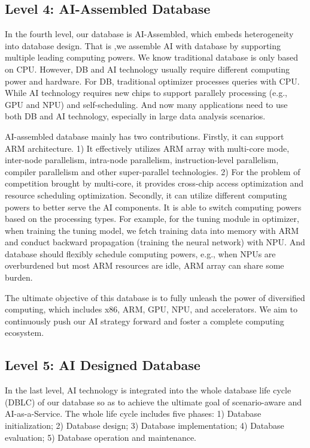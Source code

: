 \subsection{Level 4: AI-Assembled Database}
\label{subsec: assemble}
In the fourth level, our database is AI-Assembled, which embeds heterogeneity into database design. That is ,we assemble AI with database by supporting multiple leading computing powers. We know traditional database is only based on CPU. However, DB and AI technology usually require different computing power and hardware. For DB, traditional optimizer processes queries with CPU. While AI technology requires new chips to support parallely processing (e.g., GPU and NPU) and self-scheduling. And now many applications need to use both DB and AI technology, especially in large data analysis scenarios.

AI-assembled database mainly has two contributions. Firstly, it can support ARM architecture. 
1) It effectively utilizes ARM array with multi-core mode, inter-node parallelism, intra-node parallelism, instruction-level parallelism, compiler parallelism and other super-parallel technologies. 
2) For the problem of competition brought by multi-core, it provides cross-chip access optimization and resource scheduling optimization. 
Secondly, it can utilize different computing powers to better serve the AI components. It is able to switch computing powers based on the processing types. For example, for the tuning module in optimizer, when training the tuning model, we fetch training data into memory with ARM and conduct backward propagation (training the neural network) with NPU. And database should flexibly schedule computing powers, e.g., when NPUs are overburdened but most ARM resources are idle, ARM array can share some burden.

The ultimate objective of this database is to fully unleash the power of diversified computing, which includes x86, ARM, GPU, NPU, and accelerators. We aim to continuously push our AI strategy forward and foster a complete computing ecosystem. 


\subsection{Level 5: AI Designed Database}
\label{subsec: designed}
In the last level, AI technology is integrated into the whole database life cycle (DBLC) of our database so as to achieve the ultimate goal of scenario-aware and AI-as-a-Service. The whole life cycle includes five phases: 1) Database initialization; 2) Database design; 3) Database implementation; 4) Database evaluation; 5) Database operation and maintenance.


